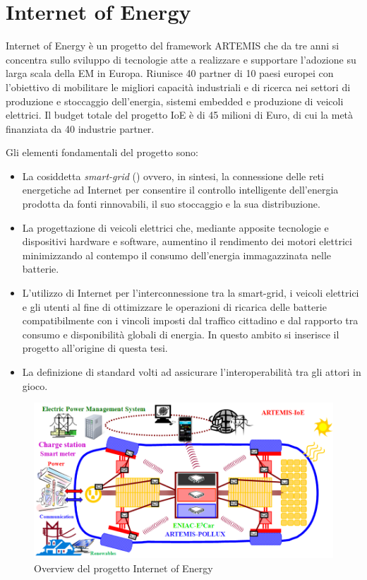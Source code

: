 \section{Internet of Energy}

Internet of Energy è un progetto del framework ARTEMIS che da tre anni si concentra sullo sviluppo di tecnologie atte a realizzare e supportare l'adozione su larga scala della EM in Europa. Riunisce 40 partner di 10 paesi europei con l'obiettivo di mobilitare le migliori capacità industriali e di ricerca nei settori di produzione e stoccaggio dell'energia, sistemi embedded e produzione di veicoli elettrici. Il budget totale del progetto IoE è di 45 milioni di Euro, di cui la metà finanziata da 40 industrie partner.

Gli elementi fondamentali del progetto sono:

\begin{itemize}
	\item La cosiddetta \emph{smart-grid} (\cite{bedogni2013machine}) ovvero, in sintesi, la connessione delle reti energetiche ad Internet per consentire il controllo intelligente dell'energia prodotta da fonti rinnovabili, il suo stoccaggio e la sua distribuzione.
	\item La progettazione di veicoli elettrici che, mediante apposite tecnologie e dispositivi hardware e software, aumentino il rendimento dei motori elettrici minimizzando al contempo il consumo dell'energia immagazzinata nelle batterie.
	\item L'utilizzo di Internet per l'interconnessione tra la smart-grid, i veicoli elettrici e gli utenti al fine di ottimizzare le operazioni di ricarica delle batterie compatibilmente con i vincoli imposti dal traffico cittadino e dal rapporto tra consumo e disponibilità globali di energia. In questo ambito si inserisce il progetto all'origine di questa tesi.
	\item La definizione di standard volti ad assicurare l'interoperabilità tra gli attori in gioco.
\end{itemize}

\begin{figure}[H]
	\centering
	\includegraphics[width=1.0\textwidth]{assets/ioe.png}
	\caption{Overview del progetto Internet of Energy}
	\label{fig:ioe}
\end{figure}

